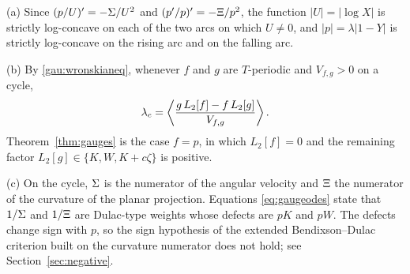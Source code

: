 \begin{remark}\label{gau:remarks}
(a) Since $(p/U)'=-\Sigma/U^2$ and $(p'/p)'=-\Xi/p^2$, the function $|U|=|\log X|$ is strictly log-concave on each of the two arcs on which $U\ne0$, and $|p|=\lambda|1-Y|$ is strictly log-concave on the rising arc and on the falling arc.

(b) By \eqref{gau:wronskianeq}, whenever $f$ and $g$ are $T$-periodic and $V_{f,g}>0$ on a cycle,
\[
\lambda_c=\left\langle \frac{g\,L_2[f]-f\,L_2[g]}{V_{f,g}}\right\rangle .
\]
Theorem~\ref{thm:gauges} is the case $f=p$, in which $L_2[f]=0$ and the remaining factor $L_2[g]\in\{K,W,K+c\zeta\}$ is positive.

(c) On the cycle, $\Sigma$ is the numerator of the angular velocity and $\Xi$ the numerator of the curvature of the planar projection. Equations \eqref{eq:gaugeodes} state that $1/\Sigma$ and $1/\Xi$ are Dulac-type weights whose defects are $pK$ and $pW$. The defects change sign with $p$, so the sign hypothesis of the extended Bendixson--Dulac criterion built on the curvature numerator \cite[Theorem~2.3]{GG21} does not hold; see Section~\ref{sec:negative}.
\end{remark}

